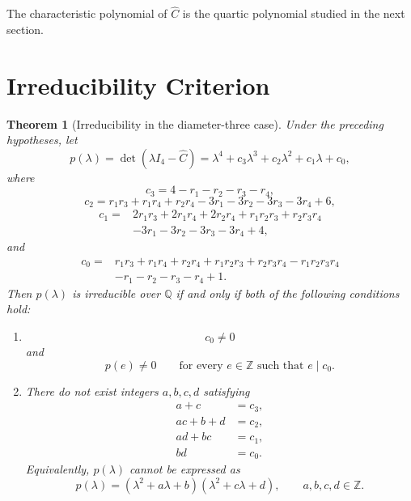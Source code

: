 \documentclass[11pt]{amsart}
\newtheorem{thm}{\bf Theorem}[section]
\begin{document}
The characteristic polynomial of \(\widehat C\) is the quartic polynomial studied in the next section.


\section{Irreducibility Criterion}
\label{sec:irreducibility-criterion}


\begin{thm}[Irreducibility in the diameter-three case]
\label{thm:diam3-irreducibility}
Under the preceding hypotheses, let
\[
p(\lambda)=\det(\lambda I_4-\widehat C)
=\lambda^4+c_3\lambda^3+c_2\lambda^2+c_1\lambda+c_0,
\]
where
\[
c_3=4-r_1-r_2-r_3-r_4,
\]
\[
c_2=
r_1r_3+r_1r_4+r_2r_4
-3r_1-3r_2-3r_3-3r_4+6,
\]
\[
\begin{aligned}
c_1={}&2r_1r_3+2r_1r_4+2r_2r_4
+r_1r_2r_3+r_2r_3r_4\\
&-3r_1-3r_2-3r_3-3r_4+4,
\end{aligned}
\]
and
\[
\begin{aligned}
c_0={}&r_1r_3+r_1r_4+r_2r_4
+r_1r_2r_3+r_2r_3r_4-r_1r_2r_3r_4\\
&-r_1-r_2-r_3-r_4+1.
\end{aligned}
\]
Then \(p(\lambda)\) is irreducible over \(\mathbb Q\) if and only if both of the following conditions hold:

\begin{enumerate}[label=\textup{(\roman*)}]
    \item
    \[
    c_0 \neq 0
    \]
    and
    \[
    p(e)\neq 0
    \qquad
    \text{for every } e\in\mathbb{Z} \text{ such that } e\mid c_0.
    \]
    \item There do not exist integers \(a,b,c,d\) satisfying
    \[
    \begin{aligned}
        a+c     &= c_3,\\
        ac+b+d  &= c_2,\\
        ad+bc   &= c_1,\\
        bd      &= c_0.
    \end{aligned}
    \]
    Equivalently, \(p(\lambda)\) cannot be expressed as
    \[
    p(\lambda)
    =
    (\lambda^2+a\lambda+b)
    (\lambda^2+c\lambda+d),
    \qquad a,b,c,d\in\mathbb{Z}.
    \]
\end{enumerate}


\end{thm}
\end{document}

